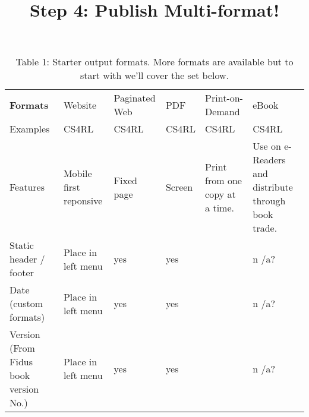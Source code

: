 \documentclass{article}
\begin{document}
\title{Step 4: Publish Multi-format!}

\maketitle

\begin{table}
\caption*{Table 1: Starter output formats. More formats are available but to start with we'll cover the set below.}\label{T63104901}

\begin{tabu} to \textwidth { |X|X|X|X|X|X| }
\hline



\textbf{Formats} & Website & Paginated Web & PDF & Print-on-Demand & eBook
 \\


Examples & CS4RL & CS4RL & CS4RL & CS4RL & CS4RL
 \\


Features & Mobile first reponsive & Fixed page & Screen & Print from one copy at a time.  & Use on e-Readers and distribute through book trade.
 \\


Static header / footer & Place in left menu & yes & yes &  & n /a?
 \\


Date (custom formats) & Place in left menu & yes & yes &  & n /a?
 \\


Version (From Fidus book version No.) & Place in left menu & yes & yes &  & n /a?
 \\
\hline

\end{tabu}\end{table}
\end{document}
